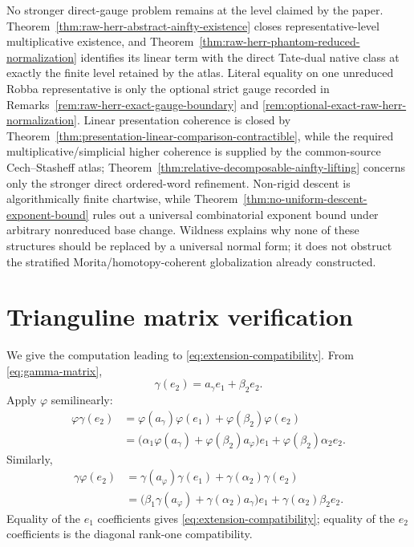\documentclass[11pt]{article}
\theoremstyle{definition}
\begin{document}
No stronger direct-gauge problem remains at the level claimed by the paper.  Theorem~\ref{thm:raw-herr-abstract-ainfty-existence} closes representative-level multiplicative existence, and Theorem~\ref{thm:raw-herr-phantom-reduced-normalization} identifies its linear term with the direct Tate-dual native class at exactly the finite level retained by the atlas.  Literal equality on one unreduced Robba representative is only the optional strict gauge recorded in Remarks~\ref{rem:raw-herr-exact-gauge-boundary} and \ref{rem:optional-exact-raw-herr-normalization}.  Linear presentation coherence is closed by Theorem~\ref{thm:presentation-linear-comparison-contractible}, while the required multiplicative/simplicial higher coherence is supplied by the common-source Cech--Stasheff atlas; Theorem~\ref{thm:relative-decomposable-ainfty-lifting} concerns only the stronger direct ordered-word refinement.  Non-rigid descent is algorithmically finite chartwise, while Theorem~\ref{thm:no-uniform-descent-exponent-bound} rules out a universal combinatorial exponent bound under arbitrary nonreduced base change.  Wildness explains why none of these structures should be replaced by a universal normal form; it does not obstruct the stratified Morita/homotopy-coherent globalization already constructed.

\appendix

\section{Trianguline matrix verification}

We give the computation leading to \eqref{eq:extension-compatibility}.  From \eqref{eq:gamma-matrix},
\[
\gamma(e_2)=a_\gamma e_1+\beta_2e_2.
\]
Apply $\varphi$ semilinearly:
\begin{align*}
\varphi\gamma(e_2)
&=\varphi(a_\gamma)\varphi(e_1)+\varphi(\beta_2)\varphi(e_2)\\
&=\bigl(\alpha_1\varphi(a_\gamma)+\varphi(\beta_2)a_\varphi\bigr)e_1
+\varphi(\beta_2)\alpha_2e_2.
\end{align*}
Similarly,
\begin{align*}
\gamma\varphi(e_2)
&=\gamma(a_\varphi)\gamma(e_1)+\gamma(\alpha_2)\gamma(e_2)\\
&=\bigl(\beta_1\gamma(a_\varphi)+\gamma(\alpha_2)a_\gamma\bigr)e_1
+\gamma(\alpha_2)\beta_2e_2.
\end{align*}
Equality of the $e_1$ coefficients gives \eqref{eq:extension-compatibility}; equality of the $e_2$ coefficients is the diagonal rank-one compatibility.
\end{document}
